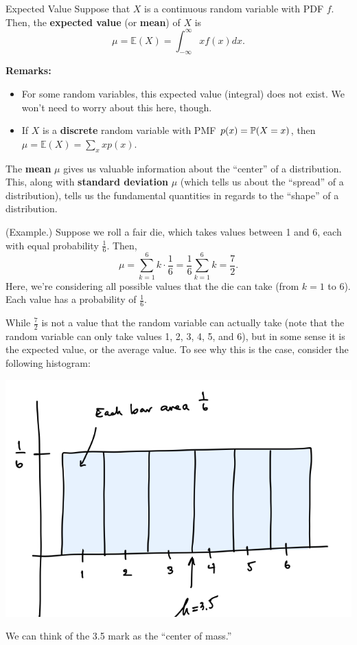\begin{definition}{Expected Value}{}
    Suppose that $X$ is a continuous random variable with PDF $f$. Then, the \textbf{expected value} (or \textbf{mean}) of $X$ is 
    \[\mu = \mathbb{E}(X) = \int_{-\infty}^{\infty} xf(x)dx.\]
\end{definition}
\textbf{Remarks:} 
\begin{itemize}
    \item For some random variables, this expected value (integral) does not exist. We won't need to worry about this here, though. 
    \item If $X$ is a \textbf{discrete} random variable with PMF $p(x) = \mathbb{P}(X = x)$, then $\mu = \mathbb{E}(X) = \sum_{x} xp(x)$. 
\end{itemize}
The \textbf{mean} $\mu$ gives us valuable information about the ``center'' of a distribution. This, along with \textbf{standard deviation} $\mu$ (which tells us about the ``spread'' of a distribution), tells us the fundamental quantities in regards to the ``shape'' of a distribution. 

\begin{mdframed}[]
    (Example.) Suppose we roll a fair die, which takes values between 1 and 6, each with equal probability $\frac{1}{6}$. Then, 
    \[\mu = \sum_{k = 1}^{6} k \cdot \frac{1}{6} = \frac{1}{6} \sum_{k = 1}^{6} k = \frac{7}{2}.\]
    Here, we're considering all possible values that the die can take (from $k = 1$ to 6). Each value has a probability of $\frac{1}{6}$. 

    \bigskip 

    While $\frac{7}{2}$ is not a value that the random variable can actually take (note that the random variable can only take values 1, 2, 3, 4, 5, and 6), but in some sense it is the expected value, or the average value. To see why this is the case, consider the following histogram:  
    \begin{center}
        \includegraphics[scale=0.7]{assets/lec14die.png}
    \end{center} 
    We can think of the 3.5 mark as the ``center of mass.''
\end{mdframed}

